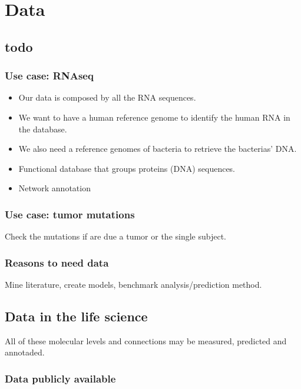 \chapter{Data}

\section{todo}

\subsection{Use case: RNAseq}

\begin{itemize}
\item Our data is composed by all the RNA sequences.
\item We want to have a human reference genome to identify the human RNA in the database.
\item We also need a reference genomes of bacteria to retrieve the bacterias' DNA.
\item Functional database that groups proteins (DNA) sequences.
\item Network annotation
\end{itemize}

\subsection{Use case: tumor mutations}

Check the mutations if are due a tumor or the single subject.

\subsection{Reasons to need data}

Mine literature, create models, benchmark analysis/prediction method.

\section{Data in the life science}


All of these molecular levels and connections may be measured, predicted and annotaded.

\subsection{Data publicly available}

